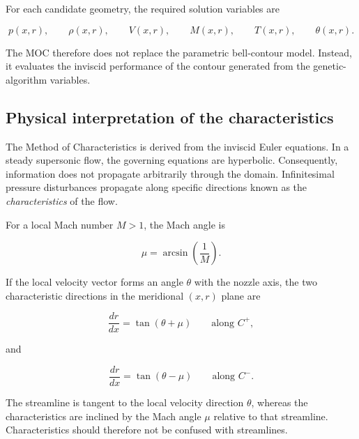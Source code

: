 For each candidate geometry, the required solution variables are

\begin{equation}
    p(x,r), \qquad
    \rho(x,r), \qquad
    V(x,r), \qquad
    M(x,r), \qquad
    T(x,r), \qquad
    \theta(x,r).
\end{equation}

The MOC therefore does not replace the parametric bell-contour model.
Instead, it evaluates the inviscid performance of the contour generated
from the genetic-algorithm variables.

\subsection{Physical interpretation of the characteristics}

The Method of Characteristics is derived from the inviscid Euler
equations. In a steady supersonic flow, the governing equations are
hyperbolic. Consequently, information does not propagate arbitrarily
through the domain. Infinitesimal pressure disturbances propagate along
specific directions known as the \emph{characteristics} of the flow.

For a local Mach number $M>1$, the Mach angle is

\begin{equation}
    \boxed{
    \mu =
    \arcsin\left(\frac{1}{M}\right)
    }.
    \label{eq:mach_angle}
\end{equation}

If the local velocity vector forms an angle $\theta$ with the nozzle
axis, the two characteristic directions in the meridional $(x,r)$
plane are

\begin{equation}
    \boxed{
    \frac{dr}{dx}
    =
    \tan(\theta+\mu)
    }
    \qquad \text{along } C^+,
    \label{eq:cplus_direction}
\end{equation}

and

\begin{equation}
    \boxed{
    \frac{dr}{dx}
    =
    \tan(\theta-\mu)
    }
    \qquad \text{along } C^-.
    \label{eq:cminus_direction}
\end{equation}

The streamline is tangent to the local velocity direction $\theta$,
whereas the characteristics are inclined by the Mach angle $\mu$
relative to that streamline. Characteristics should therefore not be
confused with streamlines.

